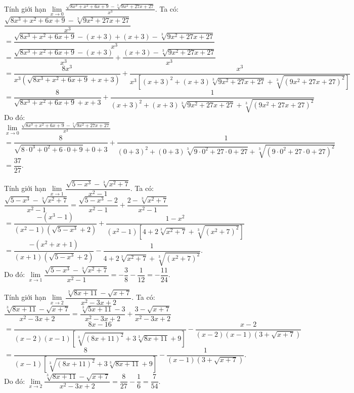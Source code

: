 \begin{bt}%
Tính giới hạn $\lim\limits_{x\to 0}\displaystyle\frac{\sqrt{8x^3+x^2+6x+9}-\sqrt[3]{9x^2+27x+27}}{x^3}$.
\loigiai
{
Ta có: $\dfrac{\sqrt{8x^3+x^2+6x+9}-\sqrt[3]{9x^2+27x+27}}{x^3}$\\
$= \dfrac{\sqrt{8x^3+x^2+6x+9}-(x+3)+(x+3)-\sqrt[3]{9x^2+27x+27}}{x^3}$\\
$= \dfrac{\sqrt{8x^3+x^2+6x+9}-(x+3)}{x^3}+\dfrac{(x+3)-\sqrt[3]{9x^2+27x+27}}{x^3}$\\
$= \dfrac{8x^3}{x^3\left(\sqrt{8x^3+x^2+6x+9}+x+3\right)}+\dfrac{x^3}{x^3\left[(x+3)^2+(x+3)\sqrt[3]{9x^2+27x+27}+\sqrt[3]{(9x^2+27x+27)^2}\right]}$\\
$= \dfrac{8}{\sqrt{8x^3+x^2+6x+9}+x+3}+\dfrac{1}{(x+3)^2+(x+3)\sqrt[3]{9x^2+27x+27}+\sqrt[3]{(9x^2+27x+27)^2}}$\\
Do đó:\\
$\lim\limits_{x\to 0}\displaystyle\frac{\sqrt{8x^3+x^2+6x+9}-\sqrt[3]{9x^2+27x+27}}{x^3}$\\
$= \dfrac{8}{\sqrt{8 \cdot 0^3+0^2+6 \cdot 0+9}+0+3}+\dfrac{1}{(0+3)^2+(0+3)\sqrt[3]{9 \cdot 0^2+27 \cdot 0+27}+\sqrt[3]{(9 \cdot 0^2+27 \cdot 0+27)^2}}$\\
$= \dfrac{37}{27}$.
}
\end{bt}


\begin{bt}%
Tính giới hạn $\lim\limits_{x \to 1}\dfrac{\sqrt{5 - x^3} - \sqrt[3]{x^2 + 7}}{x^2 -1}$.
\loigiai
{
Ta có:\\
$\dfrac{\sqrt{5 - x^3} - \sqrt[3]{x^2 + 7}}{x^2 -1} = \dfrac{\sqrt{5-x^3}-2}{x^2-1} + \dfrac{2 - \sqrt[3]{x^2+7}}{x^2-1}$\\
$= \dfrac{-(x^3-1)}{(x^2-1)\left(\sqrt{5-x^3} + 2\right)} + \dfrac{1-x^2}{(x^2-1)\left[4 + 2 \sqrt[3]{x^2+7} + \sqrt[3]{(x^2+7)^2}\right]}$\\
$= \dfrac{-(x^2+x+1)}{(x+1)\left(\sqrt{5-x^3} + 2\right)} - \dfrac{1}{4 + 2 \sqrt[3]{x^2+7} + \sqrt[3]{(x^2+7)^2}}$.\\
Do đó: $\lim\limits_{x \to 1}\dfrac{\sqrt{5 - x^3} - \sqrt[3]{x^2 + 7}}{x^2 -1} = -\dfrac{3}{8} - \dfrac{1}{12} = -\dfrac{11}{24}$.
}
\end{bt}


\begin{bt}%
Tính giới hạn $\lim\limits_{x \to 2}\dfrac{\sqrt[3]{8x+11} - \sqrt{x+7}}{x^2 - 3x +2}$.
\loigiai
{
Ta có:\\
$\dfrac{\sqrt[3]{8x+11} - \sqrt{x+7}}{x^2 - 3x +2} = \dfrac{\sqrt[3]{5x+11}-3}{x^2 - 3x +2} + \dfrac{3-\sqrt{x+7}}{x^2 - 3x + 2}$\\
$= \dfrac{8x-16}{(x-2)(x-1)\left[\sqrt[3]{(8x+11)^2}+3\sqrt[3]{8x+11}+9\right]} - \dfrac{x-2}{(x-2)(x-1)\left(3+\sqrt{x+7}\right)}$\\
$= \dfrac{8}{(x-1)\left[\sqrt[3]{(8x+11)^2}+3\sqrt[3]{8x+11}+9\right]} - \dfrac{1}{(x-1)\left(3+\sqrt{x+7}\right)}$.\\
Do đó: $\lim\limits_{x \to 2}\dfrac{\sqrt[3]{8x+11} - \sqrt{x+7}}{x^2 - 3x +2} = \dfrac{8}{27} - \dfrac{1}{6} = \dfrac{7}{54}$.
}
\end{bt}


